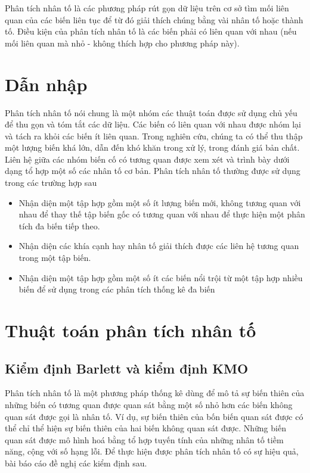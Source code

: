 \documentclass[../thesis.tex]{subfiles}
\begin{document}
Phân tích nhân tố là các phương pháp rút gọn dữ liệu trên cơ sở tìm mối liên quan của các biến liên tục để từ đó giải thích chúng bằng vài nhân tố hoặc thành tố. Điều kiện của phân tích nhân tố là các biến phải có liên quan với nhau (nếu mối liên quan mà nhỏ - không thích hợp cho phương pháp này).

\section{Dẫn nhập}

Phân tích nhân tố nói chung là một nhóm các thuật toán được sử dụng chủ yếu để thu gọn và tóm tắt các dữ liệu. Các biến có liên quan với nhau được nhóm lại và tách ra khỏi các biến ít liên quan. Trong nghiên cứu, chúng ta có thể thu thập một lượng biến khá lớn, dẫn đến khó khăn trong xử lý, trong đánh giá bản chất. Liên hệ giữa các nhóm biến cố có tương quan được xem xét và trình bày dưới dạng tổ hợp một số các nhân tố cơ bản. Phân tích nhân tố thường được sử dụng trong các trường hợp sau

\begin{itemize}
	\item Nhận diện một tập hợp gồm một số ít lượng biến mới, không tương quan với nhau để thay thế tập biến gốc có tương quan với nhau để thực hiện một phân tích đa biến tiếp theo.
	\item Nhận diện các khía cạnh hay nhân tố giải thích được các liên hệ tương quan trong một tập biến. 
	\item Nhận diện một tập hợp gồm một số ít các biến nổi trội từ một tập hợp nhiều biến để sử dụng trong các phân tích thống kê đa biến
\end{itemize}

\section{Thuật toán phân tích nhân tố}

\subsection{Kiểm định Barlett và kiểm định KMO}

Phân tích nhân tố là một phương pháp thống kê dùng để mô tả sự biến thiên của những biến có tương quan được quan sát bằng một số nhỏ hơn các biến không quan sát được gọi là nhân tố. Ví dụ, sự biến thiên của bốn biến quan sát được có thể chỉ thể hiện sự biến thiên của hai biến không quan sát được. Những biến quan sát được mô hình hoá bằng tổ hợp tuyến tính của những nhân tố tiềm năng, cộng với số hạng lỗi. Để thực hiện được phân tích nhân tố có sự hiệu quả, bài báo cáo đề nghị các kiểm định sau.
\end{document}
